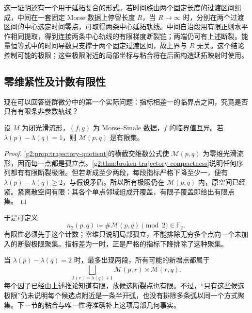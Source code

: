 这一证明还有一个用于延拓复合的形式。若时间族由两个固定长度的过渡区间组成，中间在一套固定 Morse 数据上停留长度 \(R\)，当 \(R\to\infty\) 时，分别在两个过渡区间的中心选定时间零点，可取得两条中心延拓轨线。中间自治段用有限正则水平作相同提取，得到连接两条中心轨线的有限梯度断裂链；两端仍可有上述断裂。能量恒等式中的时间导数只支撑于两个固定过渡区间，故上界与 \(R\) 无关。这个结论控制可能的极限；这些极限附近的局部坐标与粘合将在后面构造延拓映射时使用。

\subsection{零维紧性及计数有限性}
\label{g2:subsec:1802:04}

现在可以回答链群微分中的第一个实际问题：指标相差一的临界点之间，究竟是否只有有限条非参数轨线？

\begin{corollary}\label{g2:cor:zero-dimensional-trajectories-finite}
	设 \(M\) 为闭光滑流形，\((f,g)\) 为 Morse--Smale 数据，\(f\) 的临界值互异。若 \(\lambda(p)-\lambda(q)=1\)，则 \(\mathcal M(p,q)\) 是有限集。
\end{corollary}
\begin{proof}
	\cref{g2:prop:trajectory-quotient}的横截交维数公式使 \(\mathcal M(p,q)\) 为零维光滑流形，因而每一点都是孤立点。\cref{g2:thm:broken-trajectory-compactness}说明任何序列都有有限断裂极限。但若断成至少两段，每段指标严格下降至少一，便有 \(\lambda(p)-\lambda(q)\ge2\)，与假设矛盾。所以所有极限仍在 \(\mathcal M(p,q)\) 内，原空间已经紧。紧离散空间有限：其各个单点邻域组成开覆盖，有限子覆盖即给出有限点集。
\end{proof}

于是可定义
\[
	n_2(p,q)\coloneqq\#\mathcal M(p,q)\pmod2\in\mathbb F_2.
\]
有限性必须先于这个计数；零维只说明局部孤立，不能排除无穷多个点向一个未加入的断裂极限聚集。指标差为一时，正是严格的指标下降排除了这种聚集。

\ProseParagraphBreak

当 \(\lambda(p)-\lambda(q)=2\) 时，最多出现两段，所有可能的新增点都属于
\[
	\bigsqcup_{\lambda(r)=\lambda(q)+1}
	\mathcal M(p,r)\times\mathcal M(r,q).
\]
每个因子已经由上述推论知道有限，故候选断裂点也有限。不过，“只有这些候选极限”仍未说明每个候选点附近是一条半开弧，也没有排除多条弧以同一个方式聚集。下一节的粘合与唯一性将准确补上这项局部几何事实。
